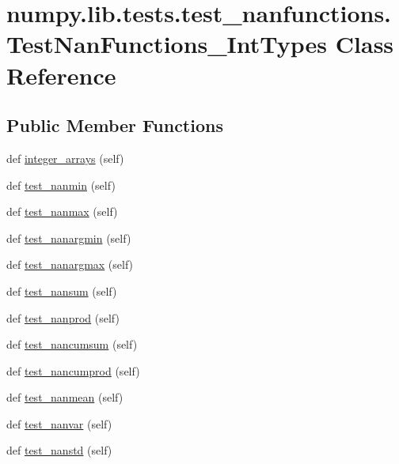 \hypertarget{classnumpy_1_1lib_1_1tests_1_1test__nanfunctions_1_1TestNanFunctions__IntTypes}{}\section{numpy.\+lib.\+tests.\+test\+\_\+nanfunctions.\+Test\+Nan\+Functions\+\_\+\+Int\+Types Class Reference}
\label{classnumpy_1_1lib_1_1tests_1_1test__nanfunctions_1_1TestNanFunctions__IntTypes}
\subsection*{Public Member Functions}
\begin{DoxyCompactItemize}
\item 
def \hyperlink{classnumpy_1_1lib_1_1tests_1_1test__nanfunctions_1_1TestNanFunctions__IntTypes_a6f1165205a8476ccd5707c83707c9bc9}{integer\+\_\+arrays} (self)
\item 
def \hyperlink{classnumpy_1_1lib_1_1tests_1_1test__nanfunctions_1_1TestNanFunctions__IntTypes_a0acdd47f11ac45020f7c2bd248387092}{test\+\_\+nanmin} (self)
\item 
def \hyperlink{classnumpy_1_1lib_1_1tests_1_1test__nanfunctions_1_1TestNanFunctions__IntTypes_a898efc7a3b99d38dea0a6538e458bf94}{test\+\_\+nanmax} (self)
\item 
def \hyperlink{classnumpy_1_1lib_1_1tests_1_1test__nanfunctions_1_1TestNanFunctions__IntTypes_ab9d690414fc21793de77fe730bb3f580}{test\+\_\+nanargmin} (self)
\item 
def \hyperlink{classnumpy_1_1lib_1_1tests_1_1test__nanfunctions_1_1TestNanFunctions__IntTypes_a70ed96d6a32f164e563089de70dda098}{test\+\_\+nanargmax} (self)
\item 
def \hyperlink{classnumpy_1_1lib_1_1tests_1_1test__nanfunctions_1_1TestNanFunctions__IntTypes_adaf2b89c2d7310bd2b9ec3a115049ca9}{test\+\_\+nansum} (self)
\item 
def \hyperlink{classnumpy_1_1lib_1_1tests_1_1test__nanfunctions_1_1TestNanFunctions__IntTypes_aa800f9888298db8499f292643641a9f4}{test\+\_\+nanprod} (self)
\item 
def \hyperlink{classnumpy_1_1lib_1_1tests_1_1test__nanfunctions_1_1TestNanFunctions__IntTypes_aa53c6617565865379486f002f462cdaa}{test\+\_\+nancumsum} (self)
\item 
def \hyperlink{classnumpy_1_1lib_1_1tests_1_1test__nanfunctions_1_1TestNanFunctions__IntTypes_a10e89f47d208beec22b6881dd5230687}{test\+\_\+nancumprod} (self)
\item 
def \hyperlink{classnumpy_1_1lib_1_1tests_1_1test__nanfunctions_1_1TestNanFunctions__IntTypes_a7363c7d85c59016f32594f841dcddbb6}{test\+\_\+nanmean} (self)
\item 
def \hyperlink{classnumpy_1_1lib_1_1tests_1_1test__nanfunctions_1_1TestNanFunctions__IntTypes_a3997d10ab7d2bd9e5729236031683922}{test\+\_\+nanvar} (self)
\item 
def \hyperlink{classnumpy_1_1lib_1_1tests_1_1test__nanfunctions_1_1TestNanFunctions__IntTypes_a5b411e3a9725978b0a4f101a2695df39}{test\+\_\+nanstd} (self)
\end{DoxyCompactItemize}
